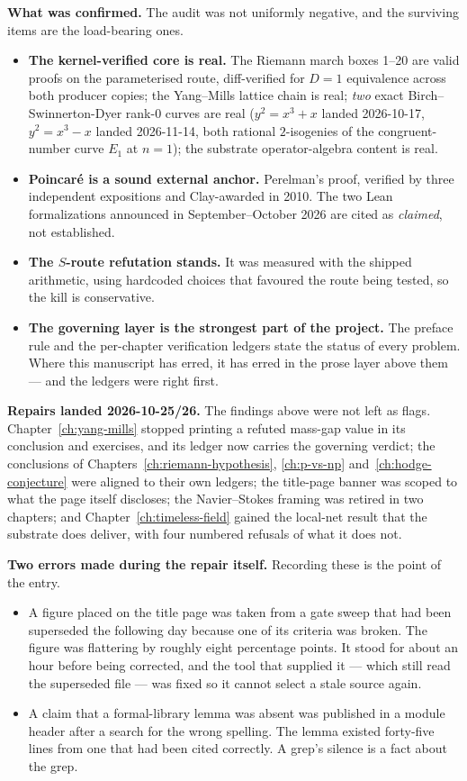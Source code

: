 \noindent\textbf{What was confirmed.} The audit was not uniformly negative, and
the surviving items are the load-bearing ones.
\begin{itemize}
\item \textbf{The kernel-verified core is real.} The Riemann march boxes
1--20 are valid proofs on the parameterised route, diff-verified for $D = 1$
equivalence across both producer copies; the Yang--Mills lattice chain is real;
\emph{two} exact Birch--Swinnerton-Dyer rank-$0$ curves are real
($y^2 = x^3 + x$ landed 2026-10-17, $y^2 = x^3 - x$ landed 2026-11-14,
both rational $2$-isogenies of the congruent-number curve $E_1$ at
$n = 1$); the substrate operator-algebra content is real.
\item \textbf{Poincar\'e is a sound external anchor.} Perelman's proof, verified
by three independent expositions and Clay-awarded in 2010. The two Lean
formalizations announced in September--October 2026 are cited as \emph{claimed},
not established.
\item \textbf{The $S$-route refutation stands.} It was measured with the
shipped arithmetic, using hardcoded choices that favoured the route being
tested, so the kill is conservative.
\item \textbf{The governing layer is the strongest part of the project.} The
preface rule and the per-chapter verification ledgers state the status of
every problem. Where this manuscript has erred, it has erred in the prose layer
above them --- and the ledgers were right first.
\end{itemize}

\noindent\textbf{Repairs landed 2026-10-25/26.} The findings above were not left
as flags. Chapter~\ref{ch:yang-mills} stopped printing a refuted mass-gap value
in its conclusion and exercises, and its ledger now carries the governing
verdict; the conclusions of Chapters~\ref{ch:riemann-hypothesis},
\ref{ch:p-vs-np} and~\ref{ch:hodge-conjecture} were aligned to their own
ledgers; the title-page banner was scoped to what the page itself discloses; the
Navier--Stokes framing was retired in two chapters; and
Chapter~\ref{ch:timeless-field} gained the local-net result that the substrate
does deliver, with four numbered refusals of what it does not.

\noindent\textbf{Two errors made during the repair itself.} Recording these is the
point of the entry.
\begin{itemize}
\item A figure placed on the title page was taken from a gate sweep that had
been superseded the following day because one of its criteria was broken. The
figure was flattering by roughly eight percentage points. It stood for about an
hour before being corrected, and the tool that supplied it --- which still read
the superseded file --- was fixed so it cannot select a stale source again.
\item A claim that a formal-library lemma was absent was published in a module
header after a search for the wrong spelling. The lemma existed forty-five lines
from one that had been cited correctly. A grep's silence is a fact about the
grep.
\end{itemize}


